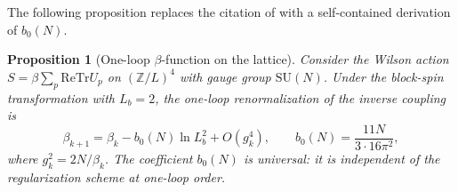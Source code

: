 \documentclass[11pt,a4paper]{amsart}
\newtheorem{proposition}[theorem]{Proposition}
\theoremstyle{definition}
\newcommand{\SU}{\mathrm{SU}}
\newcommand{\Z}{\mathbb{Z}}
\newcommand{\re}{\mathrm{Re}}
\newcommand{\Tr}{\mathrm{Tr}}
\begin{document}
The following proposition replaces the citation of \cite[Thm.~4.1]{B87}
with a self-contained derivation of $b_0(N)$.

\begin{proposition}[One-loop $\beta$-function on the lattice]
\label{prop:one_loop}
Consider the Wilson action $S = \beta \sum_p \re\Tr U_p$ on $(\Z/L)^4$
with gauge group $\SU(N)$.  Under the block-spin transformation with
$L_b = 2$, the one-loop renormalization of the inverse coupling is
\begin{equation}
\label{eq:one_loop_result}
  \beta_{k+1} = \beta_k - b_0(N)\ln L_b^2 + O(g^4_k),
  \qquad
  b_0(N) = \frac{11N}{3\cdot 16\pi^2},
\end{equation}
where $g^2_k = 2N/\beta_k$.
The coefficient $b_0(N)$ is universal: it is independent of the
regularization scheme at one-loop order.
\end{proposition}
\end{document}
